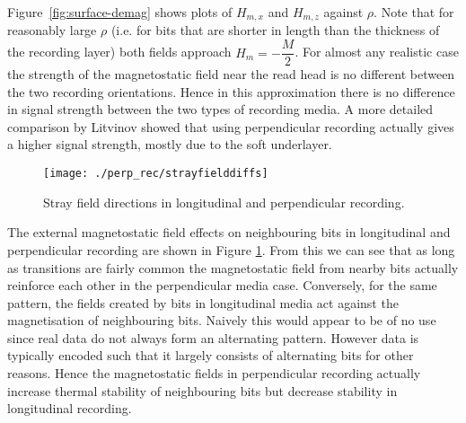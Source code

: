 Figure~\ref{fig:surface-demag} shows plots of $H_{m,x}$ and $H_{m,z}$ against
$\rho$. Note that for reasonably large $\rho$ (i.e. for bits that are shorter in
length than the thickness of the recording layer) both fields approach
$H_{m}=-\dfrac{M}{2}$. For almost any realistic case the strength of the
magnetostatic field near the read head is no different between the two recording
orientations. Hence in this approximation there is no difference in signal
strength between the two types of recording media. A more detailed comparison by
Litvinov \cite{Litvinov2005a} showed that using perpendicular recording actually
gives a higher signal strength, mostly due to the soft underlayer.

\begin{figure}
  \center
  \texttt{[image: ./perp\_rec/strayfielddiffs]}
  \caption{Stray field directions in longitudinal and perpendicular
    recording.}
  \label{fig:Stray-field-directions}
\end{figure}

The external magnetostatic field effects on neighbouring bits in longitudinal
and perpendicular recording are shown in Figure
\ref{fig:Stray-field-directions}. From this we can see that as long as
transitions are fairly common the magnetostatic field from nearby bits actually
reinforce each other in the perpendicular media case. Conversely, for the same
pattern, the fields created by bits in longitudinal media act against the
magnetisation of neighbouring bits. Naively this would appear to be of no use
since real data do not always form an alternating pattern. However data is
typically encoded such that it largely consists of alternating bits for other
reasons. Hence the magnetostatic fields in perpendicular recording actually
increase thermal stability of neighbouring bits but decrease stability in
longitudinal recording.


